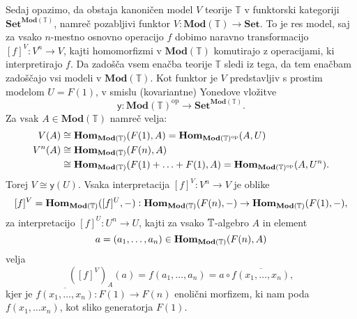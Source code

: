 \documentclass[../kategoricna_logika.tex]{subfiles}
\begin{document}
\begin{dokaz}
  Sedaj opazimo, da obstaja kanoničen model $V$ teorije $\mathbb{T}$
  v funktorski kategoriji $\mathbf{Set}^{\mathbf{Mod}(\mathbb{T})}$, namreč
  pozabljivi funktor $V : \mathbf{Mod}(\mathbb{T}) \to \mathbf{Set}$.
  To je res model, saj za vsako $n$-mestno osnovno operacijo $f$ dobimo
  naravno transformacijo $[f]^V : V^n \to V$, kajti homomorfizmi v $\mathbf{Mod}(\mathbb{T})$
  komutirajo z operacijami, ki interpretirajo $f$. Da zadošča vsem enačba teorije $\mathbb{T}$
  sledi iz tega, da tem enačbam zadoščajo vsi modeli v $\mathbf{Mod}(\mathbb{T})$.
  Kot funktor je $V$ predstavljiv s prostim modelom $U = F(1)$, v smislu (kovariantne)
  Yonedove vložitve
  \[ \mathsf{y} : \mathbf{Mod}(\mathbb{T})^{\mathrm{op}} \to \mathbf{Set}^{\mathbf{Mod}(\mathbb{T})}.\]
  Za vsak $A \in \mathbf{Mod}(\mathbb{T})$ namreč velja:
  \begin{align*}
    V(A) &\cong \mathbf{Hom}_{\mathbf{Mod}(\mathbb{T})}(F(1), A) = \mathbf{Hom}_{\mathbf{Mod}(\mathbb{T})^{\mathrm{op}}}(A,U) \\
    V^n(A) &\cong \mathbf{Hom}_{\mathbf{Mod}(\mathbb{T})}(F(n), A) \\
    &\cong \mathbf{Hom}_{\mathbf{Mod}(\mathbb{T})}(F(1) + \ldots + F(1), A) = \mathbf{Hom}_{\mathbf{Mod}(\mathbb{T})^{\mathrm{op}}}(A,U^n).
  \end{align*}
  Torej $V \cong \mathsf{y}(U)$. Vsaka interpretacija $[f]^V : V^n \to V$ je oblike
  \[ [f]^V = \mathbf{Hom}_{\mathbf{Mod}(\mathbb{T})}([f]^U, -) : \mathbf{Hom}_{\mathbf{Mod}(\mathbb{T})}(F(n), -) \to \mathbf{Hom}_{\mathbf{Mod}(\mathbb{T})}(F(1), -),\]
  za interpretacijo $[f]^U: U^n \to U$, kajti za vsako $\mathbb{T}$-algebro $A$ in element
  \[a = (a_1, \ldots ,a_n) \in \mathbf{Hom}_{\mathbf{Mod}(\mathbb{T})}(F(n), A)\]
  velja
  \[ ([f]^V)_A(a) = f(a_1, \ldots, a_n) = a \circ \overline{f(x_1, \ldots, x_n)},\]
  kjer je $\overline{f(x_1, \ldots, x_n)} : F(1) \to F(n)$ enolični morfizem, ki nam
  poda $f(x_1, \ldots x_n)$, kot sliko generatorja $F(1)$.


\end{dokaz}
\end{document}
